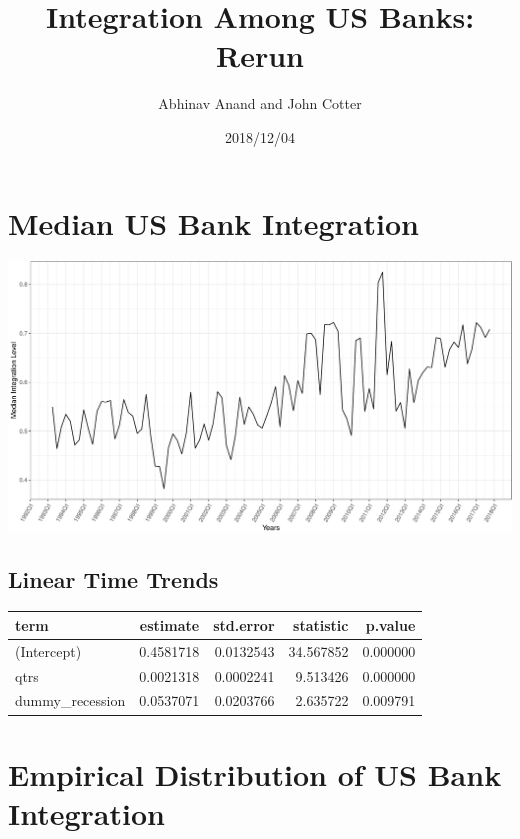 \documentclass[11pt,]{article}
\title{Integration Among US Banks: Rerun}
\author{Abhinav Anand and John Cotter}
\date{2018/12/04}
\begin{document}
\maketitle

\section{Median US Bank Integration}\label{median-us-bank-integration}

\begin{center}\includegraphics{AC_US_Bank_Int_Results_1_files/figure-latex/med_US_bank_int-1} \end{center}

\subsection{Linear Time Trends}\label{linear-time-trends}

\begin{longtable}[]{@{}lrrrr@{}}
\toprule
term & estimate & std.error & statistic & p.value\tabularnewline
\midrule
\endhead
(Intercept) & 0.4581718 & 0.0132543 & 34.567852 &
0.000000\tabularnewline
qtrs & 0.0021318 & 0.0002241 & 9.513426 & 0.000000\tabularnewline
dummy\_recession & 0.0537071 & 0.0203766 & 2.635722 &
0.009791\tabularnewline
\bottomrule
\end{longtable}

\section{Empirical Distribution of US Bank
Integration}\label{empirical-distribution-of-us-bank-integration}
\end{document}
